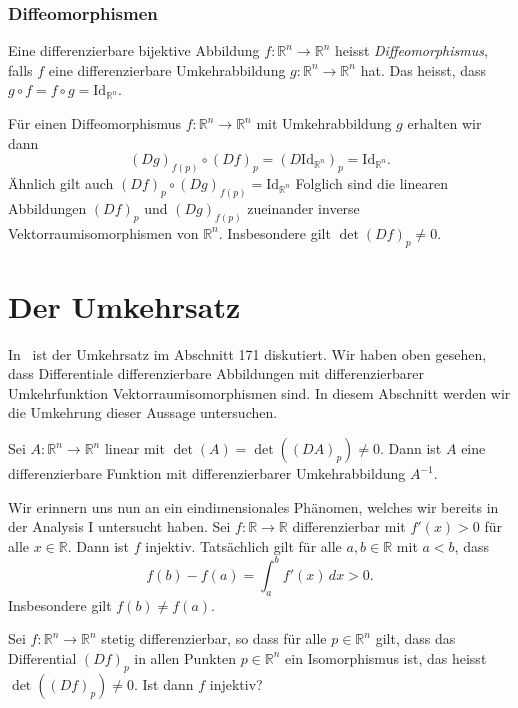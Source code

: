 \documentclass[../main.tex]{subfiles}
\begin{document}
\subsubsection*{Diffeomorphismen}
\begin{definition}
  Eine differenzierbare bijektive Abbildung
  $f \colon \mathbb{R}^n \to \mathbb{R}^n$ 
  heisst \emph{Diffeomorphismus}, falls $f$ 
  eine differenzierbare Umkehrabbildung $g \colon \mathbb{R}^n \to \mathbb{R}^n$ 
  hat.
  Das heisst, dass $g \circ f = f \circ g = \text{Id}_{\mathbb{R}^n}$.
\end{definition}

Für einen Diffeomorphismus $f \colon \mathbb{R}^n \to \mathbb{R}^n$ 
mit Umkehrabbildung $g$ erhalten wir dann
\[
  {(Dg)}_{f(p)} \circ {(Df)}_p 
  = {(D \text{Id}_{\mathbb{R}^n})}_p = \text{Id}_{\mathbb{R}^n}.
\]
Ähnlich gilt auch ${(Df)}_p \circ {(Dg)}_{f(p)} = \text{Id}_{\mathbb{R}^n}$ 
Folglich sind die linearen Abbildungen
${(Df)}_p$ und ${(Dg)}_{f(p)}$ zueinander
inverse Vektorraumisomorphismen von $\mathbb{R}^n$.
Insbesondere gilt
$\det {(Df)}_p \neq 0$.

\section{Der Umkehrsatz}
In~\cite{heuser} ist der Umkehrsatz im Abschnitt 171 diskutiert.
Wir haben oben gesehen, dass Differentiale differenzierbare Abbildungen
mit differenzierbarer Umkehrfunktion Vektorraumisomorphismen sind.
In diesem Abschnitt werden wir die Umkehrung dieser Aussage
untersuchen.

\begin{example}
  Sei $A \colon \mathbb{R}^n \to \mathbb{R}^n$ linear
  mit $\det(A) = \det({(DA)}_p) \ne 0$.
  Dann ist $A$ eine differenzierbare Funktion
  mit differenzierbarer Umkehrabbildung $A^{-1}$.
\end{example}

Wir erinnern uns nun an ein eindimensionales Phänomen,
welches wir bereits in der Analysis I untersucht haben.
Sei $f \colon \mathbb{R} \to \mathbb{R}$ 
differenzierbar mit $f'(x) > 0$ für alle $x \in \mathbb{R}$.
Dann ist $f$ injektiv.
Tatsächlich gilt für alle $a, b \in \mathbb{R}$ mit $a < b$,
dass
\[
  f(b) - f(a) = \int_{a}^{b} f'(x) \, dx > 0.
\]
Insbesondere gilt $f(b) \neq f(a)$.

\begin{question}
  Sei $f \colon \mathbb{R}^n \to \mathbb{R}^n$ stetig
  differenzierbar, so dass für alle
  $p \in \mathbb{R}^n$ gilt, dass
  das Differential ${(Df)}_p$ in allen Punkten
  $p \in \mathbb{R}^n$ ein Isomorphismus ist, das heisst
  $\det({(Df)}_p) \neq 0$.
  Ist dann $f$ injektiv?
\end{question}
\end{document}
